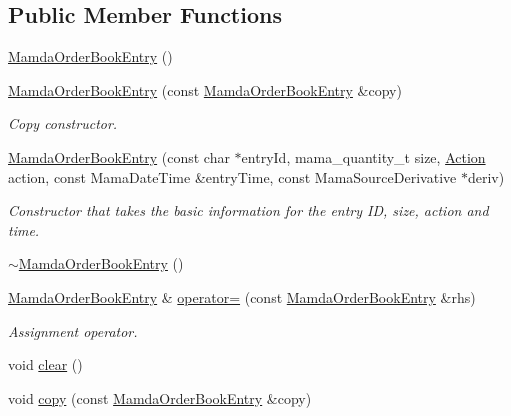 \subsection*{Public Member Functions}
\begin{CompactItemize}
\item 
\hyperlink{classWombat_1_1MamdaOrderBookEntry_57528ab4a86fde1ec6f8537692018081}{Mamda\-Order\-Book\-Entry} ()
\item 
\hyperlink{classWombat_1_1MamdaOrderBookEntry_129d31bda758f3a6bccd78c21cf7e8f0}{Mamda\-Order\-Book\-Entry} (const \hyperlink{classWombat_1_1MamdaOrderBookEntry}{Mamda\-Order\-Book\-Entry} \&copy)
\begin{CompactList}\small\item\em Copy constructor. \item\end{CompactList}\item 
\hyperlink{classWombat_1_1MamdaOrderBookEntry_2a7ac7cb5c1c23187f96d7b62f852d67}{Mamda\-Order\-Book\-Entry} (const char $\ast$entry\-Id, mama\_\-quantity\_\-t size, \hyperlink{classWombat_1_1MamdaOrderBookEntry_fc6cb1d67c7601d093a36f59cf9bcef4}{Action} action, const Mama\-Date\-Time \&entry\-Time, const Mama\-Source\-Derivative $\ast$deriv)
\begin{CompactList}\small\item\em Constructor that takes the basic information for the entry ID, size, action and time. \item\end{CompactList}\item 
\hyperlink{classWombat_1_1MamdaOrderBookEntry_e6da5c0e8daa8389cbee60184ce76d45}{$\sim$Mamda\-Order\-Book\-Entry} ()
\item 
\hyperlink{classWombat_1_1MamdaOrderBookEntry}{Mamda\-Order\-Book\-Entry} \& \hyperlink{classWombat_1_1MamdaOrderBookEntry_b0353343c7f983936ee81934c910222c}{operator=} (const \hyperlink{classWombat_1_1MamdaOrderBookEntry}{Mamda\-Order\-Book\-Entry} \&rhs)
\begin{CompactList}\small\item\em Assignment operator. \item\end{CompactList}\item 
void \hyperlink{classWombat_1_1MamdaOrderBookEntry_6fed9081344e5c08a50cc151b595bf63}{clear} ()
\item 
void \hyperlink{classWombat_1_1MamdaOrderBookEntry_ddda14d720fdf2813216321603aa71c2}{copy} (const \hyperlink{classWombat_1_1MamdaOrderBookEntry}{Mamda\-Order\-Book\-Entry} \&copy)

\end{CompactItemize}
